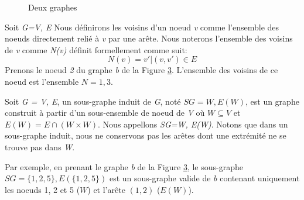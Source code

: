 \documentclass[12pt,a4paper]{article}
\begin{document}
\begin{figure}[h]
  \begin{subfigure}[b]{0.50\textwidth}
    \centering
        \caption{}
        \label{fig:x g1}
  \end{subfigure}
  \begin{subfigure}[b]{0.50\textwidth}
    \centering
        \caption{}
        \label{fig:x g2}
  \end{subfigure}
  \caption{Deux graphes}
  \label{fig:x exemple1}
\end{figure}

Soit \emph{G=V, E} Nous définirons les voisins d'un noeud \emph{v} comme l'ensemble des noeuds directement relié à \emph{v} par une arête. Nous noterons l'ensemble des voisins de \emph{v} comme \emph{N(v)} définit formellement comme suit:
\begin{equation}
N(v) = { v' | (v, v') \in E }
\end{equation}
Prenons le noeud \emph{2} du graphe \emph{b} de la Figure \ref{fig:x exemple1}. L'ensemble des voisins de ce noeud est l'ensemble \(N = {1, 3}\).


Soit \emph{G = V, E}, un sous-graphe induit de \emph{G}, noté \(SG = W, E(W)\), est un graphe construit à partir d'un sous-ensemble de noeud de \emph{V} où $ W \subseteq V $ et $ E(W) = E \cap (W \times W) $. Nous appellons \emph{SG=W, E(W)}.
Notons que dans un sous-graphe induit, nous ne conservons pas les arêtes dont une extrémité ne se trouve pas dans \emph{W}.

Par exemple, en prenant le graphe \textit{b} de la Figure \ref{fig:x exemple1}, le sous-graphe \(SG=\{1, 2, 5\}, E(\{1, 2, 5\})\) est un sous-graphe valide de \textit{b} contenant uniquement les noeuds 1, 2 et 5 (\(W\)) et l'arête \((1,2)\) (\(E(W)\)).
\end{document}
